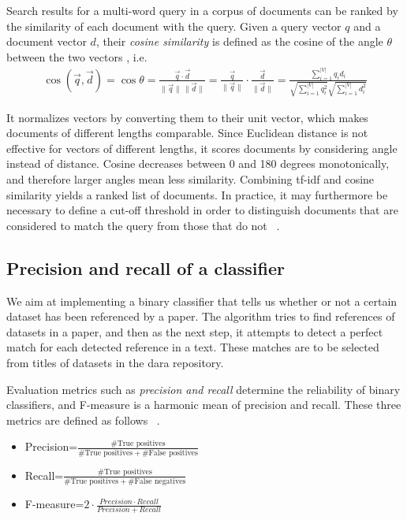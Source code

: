 \documentclass{IOS-Book-Article}
\newcommand{\dara}{\textsf{da\textbar ra}}
\begin{document}
Search results for a multi-word query in a corpus of documents can be ranked by the similarity of each document with the query. Given a query vector $q$ and a document vector $d$, their \emph{cosine similarity} is defined as the cosine of the angle $\theta$ between the two vectors \citep{SALTON1988,ChristopherD1999}, i.e.\
\begin{align*}
\operatorname{\cos}(\overrightarrow{q},\overrightarrow{d})=\cos \theta=\frac{\overrightarrow{q}\cdot \overrightarrow{d}}{\|\overrightarrow{q}\|\,\|\overrightarrow{d}\|}=\frac{\overrightarrow{q}}{\|\overrightarrow{q}\|}\cdot \frac{\overrightarrow{d}}{\|\overrightarrow{d}\|}=\frac{\sum_{i=1}^{|V|} q_id_i}{\sqrt{\sum_{i=1}^{|V|} q_i^2}\sqrt{\sum_{i=1}^{|V|} d_i^2}}
\end{align*}

It normalizes vectors by converting them to their unit vector, which makes documents of different lengths comparable. Since Euclidean distance is not effective for vectors of different lengths, it scores documents by considering angle instead of distance. Cosine decreases between 0 and 180 degrees monotonically, and therefore larger angles mean less similarity.
Combining tf-idf and cosine similarity yields a ranked list of documents. In practice, it may furthermore be necessary to define a cut-off threshold in order to distinguish documents that are considered to match the query from those that do not~ \citep{Joachims1997}.
\subsection{Precision and recall of a classifier}
\label{sec:precision-recall}
We aim at implementing a binary classifier that tells us whether or not a certain dataset has been referenced by a paper. The algorithm tries to find references of datasets in a paper, and then as the next step, it attempts to detect a perfect match for each detected reference in a text. These matches are to be selected from titles of datasets in the {\dara} repository. 

Evaluation metrics such as \emph{precision and recall} determine the reliability of binary classifiers, and F-measure is a harmonic mean of precision and recall. 
These three metrics are defined as follows ~\cite{Powers2011}. 
\begin{itemize}
	\item Precision=$\frac{\#\text{True\ positives}}{\#\text{True positives}+\#\text{False positives}}$
	\item Recall=$\frac{\#\text{True positives}}{\#\text{True positives}+\#\text{False negatives}}$
	\item F-measure=$2\cdot{\frac{\mathit{Precision}\cdot\mathit{Recall}}{\mathit{Precision}+\mathit{Recall}}}$
\end{itemize}
\end{document}
